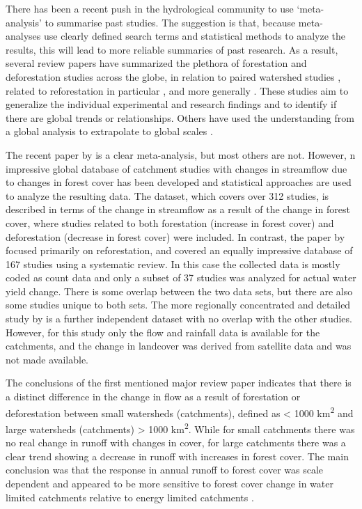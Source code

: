 \documentclass[]{elsarticle} %
\begin{document}
There has been a recent push in the hydrological community \citep{evaristo2020metaanalysis} to use `meta-analysis' to summarise past studies. The suggestion is that, because meta-analyses use clearly defined search terms and statistical methods to analyze the results, this will lead to more reliable summaries of past research. As a result, several review papers have summarized the plethora of forestation and deforestation studies across the globe, in relation to paired watershed studies \citep{brown2005, hewlett1984}, related to reforestation in particular \citep{filoso2017}, and more generally \citep{jackson2005, zhang2017}. These studies aim to generalize the individual experimental and research findings and to identify if there are global trends or relationships. Others have used the understanding from a global analysis to extrapolate to global scales \citep{hoekvandijke2022}.

The recent paper by \citet{filoso2017} is a clear meta-analysis, but most others \citep{zhang2017, hoekvandijke2022, zhou2015} are not. However, n impressive global database of catchment studies with changes in streamflow due to changes in forest cover has been developed \citep{zhang2017, filoso2017} and statistical approaches are used to analyze the resulting data. The \citet{zhang2017} dataset, which covers over 312 studies, is described in terms of the change in streamflow as a result of the change in forest cover, where studies related to both forestation (increase in forest cover) and deforestation (decrease in forest cover) were included. In contrast, the paper by \citet{filoso2017} focused primarily on reforestation, and covered an equally impressive database of 167 studies using a systematic review. In this case the collected data is mostly coded as count data and only a subset of 37 studies was analyzed for actual water yield change. There is some overlap between the two data sets, but there are also some studies unique to both sets. The more regionally concentrated and detailed study by \citet{levy2018} is a further independent dataset with no overlap with the other studies. However, for this study only the flow and rainfall data is available for the catchments, and the change in landcover was derived from satellite data and was not made available.

The conclusions of the first mentioned major review paper \citep{zhang2017} indicates that there is a distinct difference in the change in flow as a result of forestation or deforestation between small watersheds (catchments), defined as \textless{} 1000 km\textsuperscript{2} and large watersheds (catchments) \textgreater{} 1000 km\textsuperscript{2}. While for small catchments there was no real change in runoff with changes in cover, for large catchments there was a clear trend showing a decrease in runoff with increases in forest cover. The main conclusion was that the response in annual runoff to forest cover was scale dependent and appeared to be more sensitive to forest cover change in water limited catchments relative to energy limited catchments \citep{zhang2017}.
\end{document}
